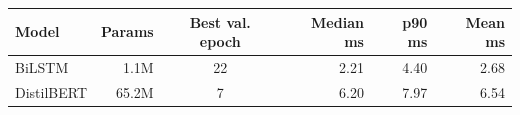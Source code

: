 \begin{tabular}{l r c r r r}
\hline
Model & Params & Best val. epoch & Median ms & p90 ms & Mean ms \\
\hline
BiLSTM & 1.1M & 22 & 2.21 & 4.40 & 2.68 \\
DistilBERT & 65.2M & 7 & 6.20 & 7.97 & 6.54 \\
\hline
\end{tabular}
